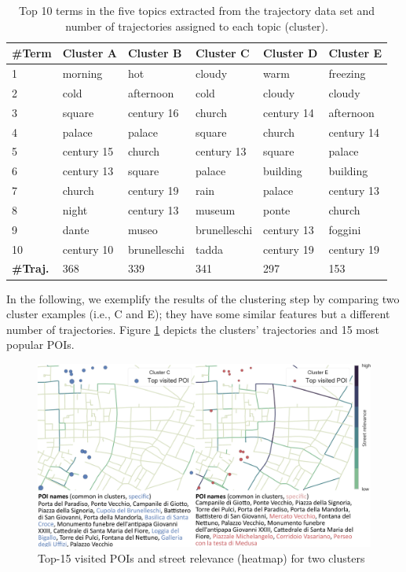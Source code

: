 \begin{table}[h]
	\centering
	
	\caption{Top 10 terms in the five topics extracted from the trajectory data set and number of trajectories assigned to each topic (cluster).}
	
	\label{tab:Topics}
	\begin{tabular}{ |l|l|l|l|l|l| }
		\hline
		\textbf{\#Term} & \textbf{Cluster A} & \textbf{Cluster B}  & \textbf{Cluster C}& \textbf{Cluster D} & \textbf{Cluster E}  \\ \hline
		1  & morning &hot &cloudy &warm &freezing   \\ \hline
		2  & cold &afternoon &cold &cloudy &cloudy   \\ \hline
		3  & square &century 16 &church &century 14 &afternoon   \\ \hline
		4  & palace &palace &square &church &century 14   \\ \hline
		5  & century 15 &church &century 13 &square &palace   \\ \hline
		6  & century 13 &square &palace &building &building   \\ \hline
		7  & church &century 19 &rain &palace &century 13   \\ \hline
		8  & night &century 13 &museum &ponte &church   \\ \hline
		9  & dante &museo &brunelleschi &century 13 &foggini   \\ \hline
		10 & century 10 &brunelleschi &tadda &century 19 &century 19   \\ \hline
		\hline
		\textbf{\#Traj.} & 368 & 339 & 341 & 297 & 153 \\ \hline
		
	\end{tabular}
\end{table}

In the following, we exemplify the results of the clustering step by comparing two cluster examples (i.e., C and E); they have some similar features but a different number of trajectories. Figure \ref{fig:cluster_map} depicts the clusters' trajectories and 15 most popular POIs.

\begin{figure}
	\centering
	\includegraphics[width=\linewidth]{cluster_comparison_poinames}
	\caption{Top-15 visited POIs and street relevance (heatmap) for two clusters}
	\label{fig:cluster_map}
\end{figure}

